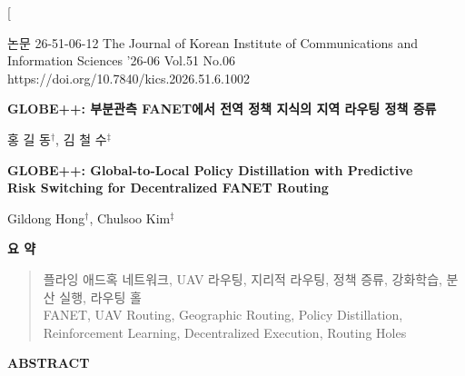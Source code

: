 \documentclass[journal,twocolumn]{IEEEtran}
\begin{document}
\twocolumn[
  \begin{center}
    \noindent
    \begin{minipage}{\textwidth}
      \small
      논문 26-51-06-12 \hfill The Journal of Korean Institute of Communications and Information Sciences '26-06 Vol.51 No.06 \\
      \hfill https://doi.org/10.7840/kics.2026.51.6.1002
      \vspace{5mm}
    \end{minipage}
    
    \vspace{5mm}
    
    {\Large \bf GLOBE++: 부분관측 FANET에서 전역 정책 지식의 지역 라우팅 정책 증류}
    
    \vspace{5mm}
    
    {\large 홍 길 동$^\dagger$, 김 철 수$^\ddagger$}
    
    \vspace{5mm}
    
    {\Large \bf GLOBE++: Global-to-Local Policy Distillation with Predictive\\ Risk Switching for Decentralized FANET Routing}
    
    \vspace{5mm}
    
    {\large Gildong Hong$^\dagger$, Chulsoo Kim$^\ddagger$}
    
    \vspace{8mm}
    
    {\bf 요 \quad 약}
    \vspace{3mm}
  \end{center}
  
  \begin{quotation}
    \noindent 
    
    \vspace{3mm}
     플라잉 애드혹 네트워크, UAV 라우팅, 지리적 라우팅, 정책 증류, 강화학습, 분산 실행, 라우팅 홀 \\
     FANET, UAV Routing, Geographic Routing, Policy Distillation, Reinforcement Learning, Decentralized Execution, Routing Holes
  \end{quotation}
  
  \vspace{5mm}
  \begin{center}
    {\bf ABSTRACT}
    \vspace{3mm}
  \end{center}
  
\end{document}
